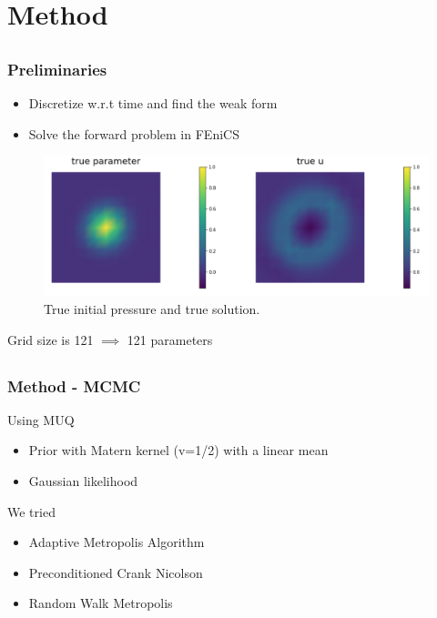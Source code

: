 \documentclass[9pt]{beamer}
\begin{document}
\section{Method}


\subsection{}
\begin{frame}
\frametitle{Preliminaries}
\begin{itemize}
\item Discretize w.r.t time and find the weak form 
\item Solve the forward problem in FEniCS
\end{itemize}
\begin{figure}
	\centering
	\includegraphics[width = \linewidth]{true.png}
	\caption{True initial pressure and true solution.}
\end{figure}
Grid size is 121 $\implies$ 121 parameters
\end{frame}
\subsection{}
\begin{frame}
\frametitle{Method - MCMC}
Using MUQ 
\begin{itemize}
\item Prior with Matern kernel (v=1/2) with a linear mean 
\item Gaussian likelihood
\end{itemize}
\vspace{3mm}
 We tried 
 \begin{itemize}
 \item Adaptive Metropolis Algorithm
 \item Preconditioned Crank Nicolson
 \item Random Walk Metropolis 
 \end{itemize}

\end{frame}
\end{document}
